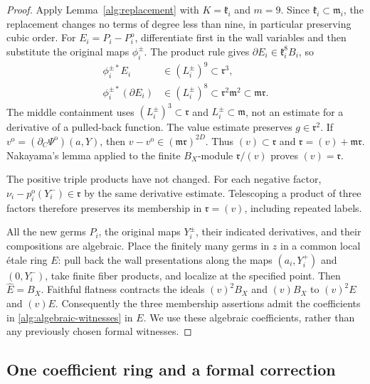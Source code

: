 \begin{proof}
Apply Lemma~\ref{alg:replacement} with $K=\mathfrak k_i$ and $m=9$.
Since $\mathfrak k_i\subset\mathfrak m_i$, the replacement changes no
terms of degree less than nine, in particular preserving cubic order.
For $E_i=P_i-P_i^{\mathrm{o}}$, differentiate first in the wall
variables and then substitute the original maps $\phi_i^\pm$.
The product rule gives $\partial E_i\in\mathfrak k_i^8B_i$, so
\begin{equation}
 \begin{split}
 \phi_i^{\pm *}E_i&\in(L_i^\pm)^9\subset\mathfrak r^3,\\
 \phi_i^{\pm *}(\partial E_i)&\in(L_i^\pm)^8
 \subset\mathfrak r^2\mathfrak m^2\subset\mathfrak m\mathfrak r.
 \end{split}
 \label{alg:ninth-order-estimates}
\end{equation}
The middle containment uses $(L_i^\pm)^3\subset\mathfrak r$ and
$L_i^\pm\subset\mathfrak m$, not an estimate for a derivative of a
pulled-back function.
The value estimate preserves $g\in\mathfrak r^2$.
If $v^{\mathrm{o}}=(\partial_C\Psi^{\mathrm{o}})(a,Y)$, then
$v-v^{\mathrm{o}}\in(\mathfrak m\mathfrak r)^{2D}$.
Thus $(v)\subset\mathfrak r$ and
$\mathfrak r=(v)+\mathfrak m\mathfrak r$. Nakayama's lemma applied
to the finite $B_X$-module $\mathfrak r/(v)$ proves $(v)=\mathfrak r$.

The positive triple products have not changed. For each negative
factor,
$\nu_i-p_i^{\mathrm{o}}(Y_i^-)\in\mathfrak r$ by the same derivative
estimate. Telescoping a product of three factors therefore preserves
its membership in $\mathfrak r=(v)$, including repeated labels.

All the new germs $P_i$, the original maps $Y_i^\pm$, their indicated
derivatives, and their compositions are algebraic. Place the finitely
many germs in $z$ in a common local \'etale ring $E$: pull back
the wall presentations along the maps $(a_i,Y_i^+)$ and $(0,Y_i^-)$,
take finite fiber products, and localize at the specified point.
Then $\widehat E=B_X$. Faithful flatness contracts the ideals
$(v)^2B_X$ and $(v)B_X$ to $(v)^2E$ and $(v)E$. Consequently the
three membership assertions admit the coefficients in
\eqref{alg:algebraic-witnesses} in $E$. We use these algebraic
coefficients, rather than any previously chosen formal witnesses.
\end{proof}

\subsection{One coefficient ring and a formal correction}

